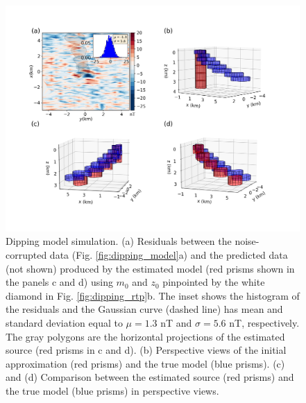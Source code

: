 \begin{figure}
    \centering
    \includegraphics[width=\linewidth]{figures/inclined-l2-solution.png}
    \caption{Dipping model simulation. (a) Residuals between the  noise-corrupted data (Fig. \ref{fig:dipping_model}a) and the predicted data (not shown) produced by the estimated model (red prisms shown in the panels c and d) using $m_0$  and $z_0$ pinpointed by the white diamond in Fig. \ref{fig:dipping_rtp}b. The inset shows the histogram of the residuals and the Gaussian curve (dashed line) has mean and standard deviation equal 
    to $\mu = 1.3$ nT and $\sigma=5.6$ nT, respectively. 
    The gray polygons are the horizontal projections of the estimated source (red prisms in c and d).
     (b) Perspective views of the initial approximation (red prisms) and the true model (blue prisms). 
     (c) and (d) Comparison between the estimated source (red prisms) and the true model (blue prisms) in perspective views.     
}
    \label{fig:dipping_results}
\end{figure}



